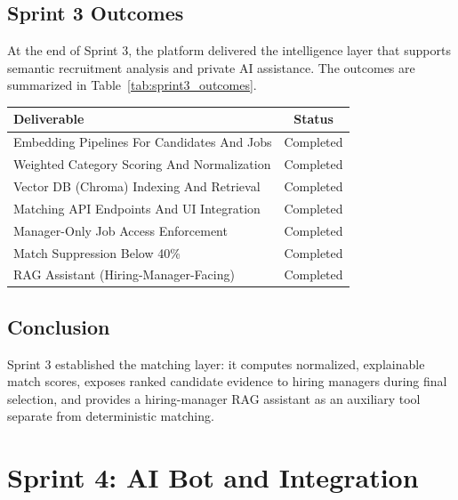 \subsection{Sprint 3 Outcomes}
\label{sec:sprint3:outcomes}

At the end of Sprint 3, the platform delivered the intelligence layer that supports semantic recruitment analysis and private AI assistance. The outcomes are summarized in Table~\ref{tab:sprint3_outcomes}.

\begin{center}
\label{tab:sprint3_outcomes}
\renewcommand{\arraystretch}{0.8}

\begin{tabular}{|l|c|}
\hline
\rowcolor{gray!20} \textbf{Deliverable} & \textbf{Status} \\
\hline
Embedding Pipelines For Candidates And Jobs & Completed \\
\hline
Weighted Category Scoring And Normalization & Completed \\
\hline
Vector DB (Chroma) Indexing And Retrieval & Completed \\
\hline
Matching API Endpoints And UI Integration & Completed \\
\hline
Manager-Only Job Access Enforcement & Completed \\
\hline
Match Suppression Below 40\% & Completed \\
\hline
RAG Assistant (Hiring-Manager-Facing) & Completed \\
\hline
\end{tabular}
\end{center}

\subsection{Conclusion}
Sprint 3 established the matching layer: it computes normalized, explainable match scores, exposes ranked candidate evidence to hiring managers during final selection, and provides a hiring-manager RAG assistant as an auxiliary tool separate from deterministic matching.

\section{Sprint 4: AI Bot and Integration} \label{chap4:sec4}

